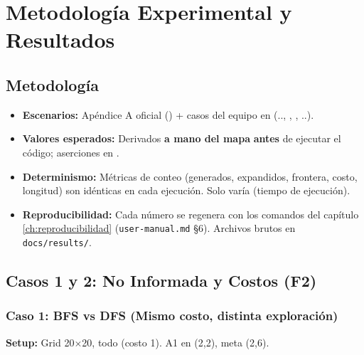 \chapter{Metodología Experimental y Resultados}
\label{ch:experimentos}

\section{Metodología}
\label{sec:metodologia}



\begin{itemize}
\item \textbf{Escenarios:} Apéndice A oficial () + casos del equipo en
   (.., , ,
  ..).
\item \textbf{Valores esperados:} Derivados \textbf{a mano del mapa} \textbf{antes} de ejecutar
  el código; aserciones en .
\item \textbf{Determinismo:} Métricas de conteo (generados, expandidos, frontera, costo, longitud)
  son idénticas en cada ejecución. Solo  varía (tiempo de ejecución).
\item \textbf{Reproducibilidad:} Cada número se regenera con los comandos del capítulo \ref{ch:reproducibilidad}
  (\texttt{user-manual.md} §6). Archivos brutos en \texttt{docs/results/}.
\end{itemize}

\section{Casos 1 y 2: No Informada y Costos (F2)}
\label{sec:resultados-f2}

\subsection{Caso 1: BFS vs DFS (Mismo costo, distinta exploración)}
\label{sec:caso1}

\textbf{Setup:} Grid 20$\times$20, todo  (costo 1). A1 en (2,2), meta (2,6).

